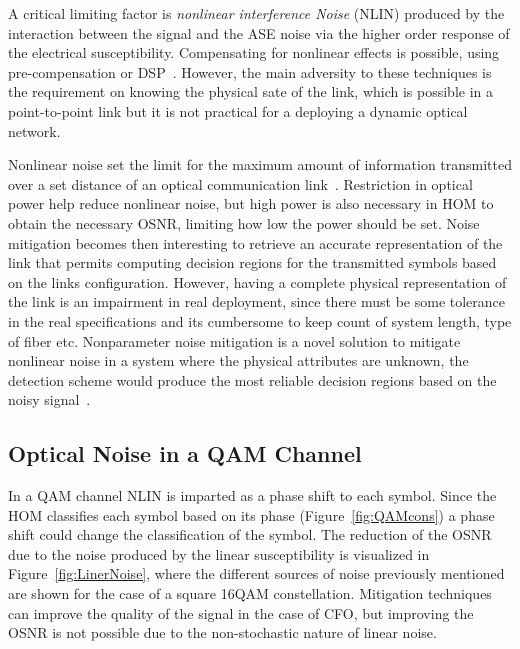 A critical limiting factor is \textit{nonlinear interference Noise} (NLIN) produced by the interaction between the signal and the ASE noise via the higher order response of the electrical susceptibility. Compensating for nonlinear effects is possible, using pre-compensation or DSP~\cite{NLPNinCFO}. However, the main adversity to these techniques is the requirement on knowing the physical sate of the link, which is possible in a point-to-point link but it is not practical for a deploying a dynamic optical network. 

Nonlinear noise set the limit for the maximum amount of information transmitted over a set distance of  an optical communication link~\cite{PrincBorn}. Restriction in optical power help reduce nonlinear noise, but high power is also necessary in HOM to obtain the necessary OSNR, limiting how low the power should be set. Noise mitigation becomes then interesting to retrieve an accurate representation of the link that permits computing decision regions for the transmitted symbols based on the links configuration. However, having a complete physical representation of the link is an impairment in real deployment, since there must be some tolerance in the real specifications and its cumbersome to keep count of system length, type of fiber etc. Nonparameter noise mitigation is a novel solution to mitigate nonlinear noise in a system where the physical attributes are unknown, the detection scheme would produce the most reliable decision regions based on the noisy signal~\cite{NLPNmPSK}.  
          

 
 
 \subsection{Optical Noise in a QAM Channel}

In a QAM channel NLIN is imparted as a phase shift to each symbol. Since the HOM classifies each symbol based on its phase (Figure~\ref{fig:QAMcons}) a phase shift could change the classification of the symbol.
The reduction of the OSNR due to the noise produced by the linear susceptibility is visualized  in Figure~\ref{fig:LinerNoise}, where the different sources of noise previously mentioned are shown for the case of a square 16QAM constellation. Mitigation techniques can improve the quality of the signal in the case of CFO, but improving the OSNR is not possible due to the non-stochastic nature of linear noise. 


